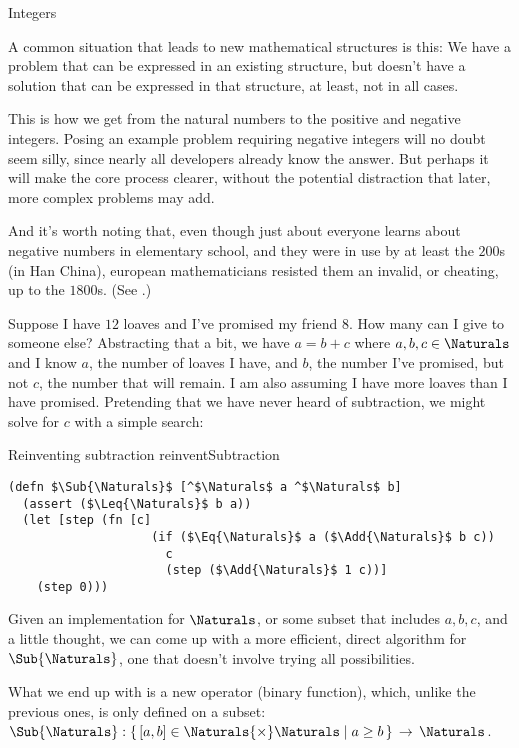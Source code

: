 \documentclass[12pt]{PalisadesLakesBook}
\begin{document}
\begin{plSection}{Integers}

A common situation that leads to new mathematical structures
is this:
We have a problem that can be expressed in an existing structure,
but doesn't have a solution that can be expressed 
in that structure, at least, not in all cases.

This is how we get from the natural numbers to the positive
and negative integers.
Posing an example problem requiring
negative integers will no doubt seem silly,
since nearly all developers already know the answer.
But perhaps it will make the core process clearer,
without the potential distraction that later,
more complex problems may add.

And it's worth noting that, even though just about everyone learns
about negative numbers in elementary school,
and they were in use by at least the $200$s (in Han China),
european mathematicians resisted them
an invalid, or cheating, up to the $1800$s. 
(See .)

Suppose I have $12$ loaves and I've promised 
my friend $8$. How many can I give to someone else?
Abstracting that a bit,
we have
$a = b + c$
where $a,b,c \in \Naturals$ and I know 
$a$, the number of loaves I have, 
and $b$, the number I've promised,
but not $c$, the number that will remain.
I am also assuming I have more loaves than I have promised.
Pretending that we have never heard of subtraction,
we might solve for $c$ with a simple search:

\begin{plAlgorithm}
{Reinventing subtraction}
{reinventSubtraction}
\begin{lstlisting}[language=pseudocode]
(defn $\Sub{\Naturals}$ [^$\Naturals$ a ^$\Naturals$ b]
  (assert ($\Leq{\Naturals}$ b a))
  (let [step (fn [c]
                    (if ($\Eq{\Naturals}$ a ($\Add{\Naturals}$ b c))
                      c
                      (step ($\Add{\Naturals}$ 1 c))]
    (step 0)))
\end{lstlisting}
\end{plAlgorithm}

Given an implementation for $\Naturals$, or some subset that
includes $a,b,c$, and a little thought, 
we can come up with a more efficient, direct algorithm 
for $\Sub{\Naturals}$, one that doesn't involve trying all 
possibilities.

What we end up with is a new operator (binary function),
which, unlike the previous ones, is only defined on a 
subset:
$\Sub{\Naturals}:
\left\{ \, [a,b] \in \Naturals{\times}\Naturals 
\; \middle|  \; a \geq b \, \right\} \, \rightarrow \, \Naturals$.



\end{plSection}
\end{document}
